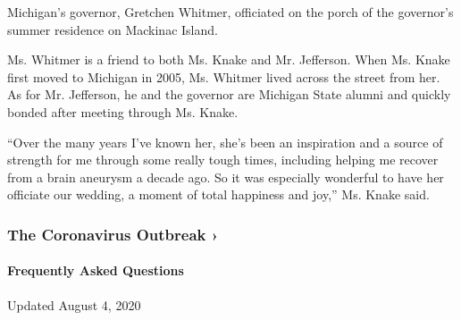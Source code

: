 Michigan's governor, Gretchen Whitmer, officiated on the porch of the
governor's summer residence on Mackinac Island.

Ms. Whitmer is a friend to both Ms. Knake and Mr. Jefferson. When Ms.
Knake first moved to Michigan in 2005, Ms. Whitmer lived across the
street from her. As for Mr. Jefferson, he and the governor are Michigan
State alumni and quickly bonded after meeting through Ms. Knake.

``Over the many years I've known her, she's been an inspiration and a
source of strength for me through some really tough times, including
helping me recover from a brain aneurysm a decade ago. So it was
especially wonderful to have her officiate our wedding, a moment of
total happiness and joy,'' Ms. Knake said.

\href{https://www.nytimes.com/news-event/coronavirus?action=click\&pgtype=Article\&state=default\&region=MAIN_CONTENT_3\&context=storylines_faq}{}

\hypertarget{the-coronavirus-outbreak-}{%
\subsubsection{The Coronavirus Outbreak
›}\label{the-coronavirus-outbreak-}}

\hypertarget{frequently-asked-questions}{%
\paragraph{Frequently Asked
Questions}\label{frequently-asked-questions}}

Updated August 4, 2020

